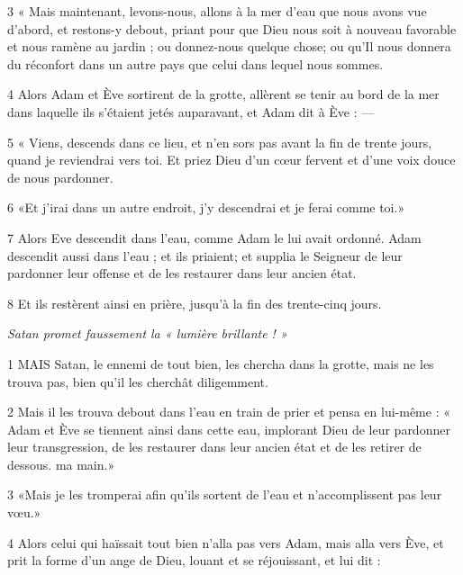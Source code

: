\par 3 « Mais maintenant, levons-nous, allons à la mer d'eau que nous avons vue d'abord, et restons-y debout, priant pour que Dieu nous soit à nouveau favorable et nous ramène au jardin ; ou donnez-nous quelque chose; ou qu'Il nous donnera du réconfort dans un autre pays que celui dans lequel nous sommes.

\par 4 Alors Adam et Ève sortirent de la grotte, allèrent se tenir au bord de la mer dans laquelle ils s'étaient jetés auparavant, et Adam dit à Ève : —

\par 5 « Viens, descends dans ce lieu, et n'en sors pas avant la fin de trente jours, quand je reviendrai vers toi. Et priez Dieu d’un cœur fervent et d’une voix douce de nous pardonner.

\par 6 «Et j'irai dans un autre endroit, j'y descendrai et je ferai comme toi.»

\par 7 Alors Eve descendit dans l'eau, comme Adam le lui avait ordonné. Adam descendit aussi dans l'eau ; et ils priaient; et supplia le Seigneur de leur pardonner leur offense et de les restaurer dans leur ancien état.

\par 8 Et ils restèrent ainsi en prière, jusqu'à la fin des trente-cinq jours.


\par \textit{Satan promet faussement la « lumière brillante ! »}

\par 1 MAIS Satan, le ennemi de tout bien, les chercha dans la grotte, mais ne les trouva pas, bien qu'il les cherchât diligemment.

\par 2 Mais il les trouva debout dans l'eau en train de prier et pensa en lui-même : « Adam et Ève se tiennent ainsi dans cette eau, implorant Dieu de leur pardonner leur transgression, de les restaurer dans leur ancien état et de les retirer de dessous. ma main.»

\par 3 «Mais je les tromperai afin qu'ils sortent de l'eau et n'accomplissent pas leur vœu.»

\par 4 Alors celui qui haïssait tout bien n'alla pas vers Adam, mais alla vers Ève, et prit la forme d'un ange de Dieu, louant et se réjouissant, et lui dit :

